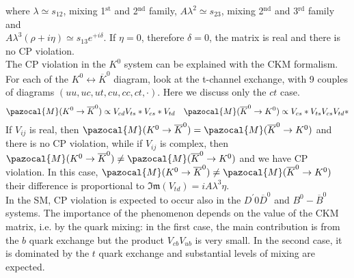 \documentclass[10.75pt,a4paper,openright,bottom=2cm]{article}
\begin{document}
where $\lambda\simeq s_{12}$, mixing 1$^{\text{st}}$ and 2$^{\text{nd}}$ family, $A\lambda^2\simeq s_{23}$, mixing 2$^{\text{nd}}$ and 3$^{\text{rd}}$ family and\\
$A\lambda^3(\rho+i\eta)\simeq s_{13}e^{+i\delta}$. If $\eta=0$, therefore $\delta=0$, the matrix is real and there is no CP violation.\\
The CP violation in the $K^0$ system can be explained with the CKM formalism. For each of the $K^0\leftrightarrow\overline{K}^0$ diagram, look at the t-channel exchange, with 9 couples of diagrams $(uu,uc,ut,cu,cc,ct,\cdot)$. Here we discuss only the $ct$ case.
\[
\pazocal{M}(K^0\to\overline{K}^0)\propto V_{cd}V_{ts}*V_{cs}*V_{td} \quad \pazocal{M}(\overline{K}^0\to K^0)\propto V_{cs}*V_{ts}V_{cs}V_{td}*
\]
If $V_{ij}$ is real, then $\pazocal{M}(K^0\to\overline{K}^0)=\pazocal{M}(\overline{K}^0\to K^0)$ and there is no CP violation, while if $V_{ij}$ is complex, then $\pazocal{M}(K^0\to\overline{K}^0)\neq\pazocal{M}(\overline{K}^0\to K^0)$ and we have CP violation. In this case, $\pazocal{M}(K^0\to\overline{K}^0)\neq\pazocal{M}(\overline{K}^0\to K^0)$ their difference is proportional to $\mathfrak{Im}(V_{td})=iA\lambda^3\eta$.\\
In the SM, CP violation is expected to occur also in the $D^'0\overline{D}^0$ and $B^0-\overline{B}^0$ systems. The importance of the phenomenon depends on the value of the CKM matrix, i.e. by the quark mixing: in the first case, the main contribution is from the $b$ quark exchange but the product $V_{cb}V_{ub}$ is very small. In the second case, it is dominated by the $t$ quark exchange and substantial levels of mixing are expected.
\end{document}
